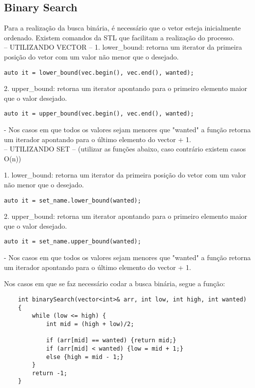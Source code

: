 \subsection{Binary Search}
Para a realização da busca binária, é necessário que o vetor esteja inicialmente ordenado. Existem comandos da STL que facilitam a realização do processo.\\

-- UTILIZANDO VECTOR --
1. lower\_bound: retorna um iterator da primeira posição do vetor com um valor não menor que o desejado.
\begin{verbatim}
auto it = lower_bound(vec.begin(), vec.end(), wanted);
\end{verbatim}

2. upper\_bound: retorna um iterator apontando para o primeiro elemento maior que o valor desejado.
\begin{verbatim}
auto it = upper_bound(vec.begin(), vec.end(), wanted);
\end{verbatim}
- Nos casos em que todos os valores sejam menores que "wanted" a função retorna um iterador apontando para o último elemento do vector + 1.\\

-- UTILIZANDO SET -- (utilizar as funções abaixo, caso contrário existem casos O(n))

1. lower\_bound: retorna um iterator da primeira posição do vetor com um valor não menor que o desejado.
\begin{verbatim}
auto it = set_name.lower_bound(wanted);
\end{verbatim}

2. upper\_bound: retorna um iterator apontando para o primeiro elemento maior que o valor desejado.
\begin{verbatim}
auto it = set_name.upper_bound(wanted);
\end{verbatim}
- Nos casos em que todos os valores sejam menores que "wanted" a função retorna um iterador apontando para o último elemento do vector + 1.

Nos casos em que se faz necessário codar a busca binária, segue a função:
\begin{verbatim}
    int binarySearch(vector<int>& arr, int low, int high, int wanted) 
    { 
        while (low <= high) { 
            int mid = (high + low)/2; 

            if (arr[mid] == wanted) {return mid;} 
            if (arr[mid] < wanted) {low = mid + 1;}  
            else {high = mid - 1;} 
        } 
        return -1; 
    } 
\end{verbatim}

